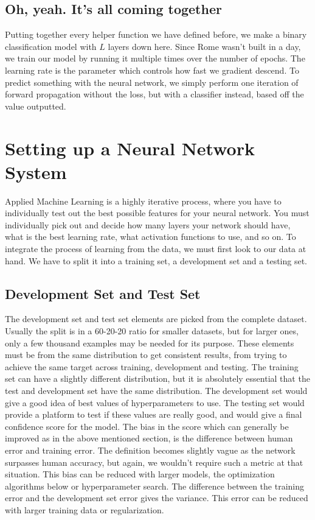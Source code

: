 \documentclass{article}
\begin{document}
\subsection{Oh, yeah. It's all coming together}

Putting together every helper function we have defined before, we make a binary classification model with $L$ layers down here. Since Rome wasn't built in a day, we train our model by running it multiple times over the number of epochs. The learning rate is the parameter which controls how fast we gradient descend. To predict something with the neural network, we simply perform one iteration of forward propagation without the loss, but with a classifier instead, based off the value outputted.


\section{Setting up a Neural Network System}

Applied Machine Learning is a highly iterative process, where you have to individually test out the best possible features for your neural network. You must individually pick out and decide how many layers your network should have, what is the best learning rate, what activation functions to use, and so on. To integrate the process of learning from the data, we must first look to our data at hand. We have to split it into a training set, a development set and a testing set. 

\subsection{Development Set and Test Set}

The development set and test set elements are picked from the complete dataset. Usually the split is in a 60-20-20 ratio for smaller datasets, but for larger ones, only a few thousand examples may be needed for its purpose. These elements must be from the same distribution to get consistent results, from trying to achieve the same target across training, development and testing. The training set can have a slightly different distribution, but it is absolutely essential that the test and development set have the same distribution. The development set would give a good idea of best values of hyperparameters to use. The testing set would provide a platform to test if these values are really good, and would give a final confidence score for the model. The bias in the score which can generally be improved as in the above mentioned section, is the difference between human error and training error. The definition becomes slightly vague as the network surpasses human accuracy, but again, we wouldn't require such a metric at that situation. This bias can be reduced with larger models, the optimization algorithms below or hyperparameter search. The difference between the training error and the development set error gives the variance. This error can be reduced with larger training data or regularization. 
\end{document}
